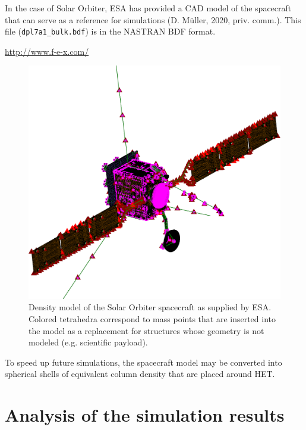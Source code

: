 In the case of Solar Orbiter, ESA has provided a CAD model of the spacecraft that can serve as a reference for simulations (D. Müller, 2020, priv. comm.). This file (\texttt{dpl7a1\_bulk.bdf}) is in the NASTRAN BDF format.

\url{http://www.f-e-x.com/}

\begin{figure}
	\centering
	\includegraphics[width=0.7\linewidth]{images/solo_spacecraft_model}
	\caption[Density model of the Solar Orbiter spacecraft]{Density model of the Solar Orbiter spacecraft as supplied by ESA. Colored tetrahedra correspond to mass points that are inserted into the model as a replacement for structures whose geometry is not modeled (e.g. scientific payload).}
	\label{fig:solo_spacecraft_model}
\end{figure}

To speed up future simulations, the spacecraft model may be converted into spherical shells of equivalent column density that are placed around HET.

\section{Analysis of the simulation results}
